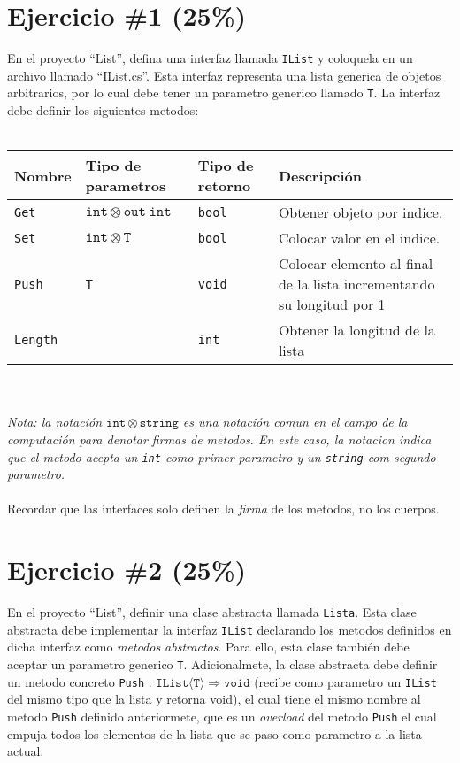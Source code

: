 \documentclass{article}
\begin{document}
\section*{Ejercicio \#1 (25\%)}

En el proyecto ``List'', defina una interfaz llamada \texttt{IList} y coloquela en
un archivo llamado ``IList.cs''. Esta interfaz representa una lista generica de objetos
arbitrarios, por lo cual debe tener un parametro generico llamado \texttt{T}. La interfaz
debe definir los siguientes metodos:
\\\\
\begin{tabular}{|l|l|l|p{7cm}|}
        \hline
        {\bf Nombre} & {\bf Tipo de parametros} & {\bf Tipo de retorno} & {\bf Descripci\'on} \\
        \hline
        \texttt{Get} & $\mathtt{int}\otimes\mathtt{out}\ \mathtt{int}$ & \texttt{bool} & Obtener objeto por indice. \\
        \hline
        \texttt{Set} & $\mathtt{int}\otimes\mathtt{T}$ & \texttt{bool} & Colocar valor en el indice. \\
        \hline
        \texttt{Push} & \texttt{T} & \texttt{void} & Colocar elemento al final de la lista incrementando su longitud por 1 \\
        \hline
        \texttt{Length} & & \texttt{int} & Obtener la longitud de la lista \\
        \hline
\end{tabular}
\\\\
\emph{Nota: la notaci\'on $\mathtt{int}\otimes\mathtt{string}$ es una notaci\'on comun en el campo
de la computaci\'on para denotar firmas de metodos. En este caso, la notacion indica que el metodo
acepta un \texttt{int} como primer parametro y un \texttt{string} com segundo parametro.}
\\\\
Recordar que las interfaces solo definen la \emph{firma} de los metodos, no los
cuerpos.
\section*{Ejercicio \#2 (25\%)}
En el proyecto ``List'', definir una clase abstracta llamada \texttt{Lista}. Esta clase abstracta debe
implementar la interfaz \texttt{IList} declarando los metodos definidos en dicha
interfaz como \emph{metodos abstractos}. Para ello, esta clase tambi\'en debe
aceptar un parametro generico \texttt{T}. Adicionalmete, la clase abstracta debe
definir un metodo concreto \texttt{Push} : $\mathtt{IList\langle T\rangle}
\Rightarrow\mathtt{void}$ (recibe como parametro un \texttt{IList} del mismo tipo
que la lista y retorna void), el cual tiene el mismo nombre al metodo \texttt{Push}
definido anteriormete, que es un \emph{overload} del metodo \texttt{Push} el cual
empuja todos los elementos de la lista que se paso como parametro a la lista
actual.
\end{document}

